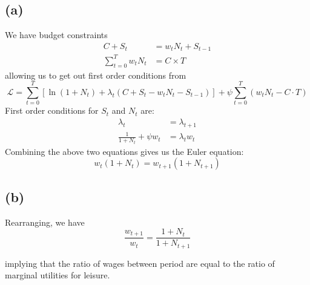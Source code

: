 \documentclass[11pt]{amsart}
\begin{document}
\subsection*{(a)}
We have budget constraints
	\begin{align*}
	C + S_t &= w_t N_t + S_{t-1} \\
	\sum_{t=0}^{T} w_t N_t & = C \times T
	\end{align*} 
allowing us to get out first order conditions from
	\begin{equation*}
	\mathcal{L} = \sum_{t=0}^{T}  \left[ \ln (1+ N_t) + \lambda_t \left(C + S_t - w_t N_t - S_{t-1} \right) \right] + \psi \sum_{t=0}^{T} \left( w_t N_t - C \cdot T\right)  
	\end{equation*}
    First order conditions for $S_t$ and $N_t$ are: 
    \begin{align*}
    \lambda_t &= \lambda_{t+1} \\
    \frac{1}{1+N_t} + \psi w_t &= \lambda_t w_t 
    \end{align*}
    Combining the above two equations gives us the Euler equation: 
    \begin{equation*}
    w_t (1+ N_t) = w_{t+1} (1+N_{t+1})
    \end{equation*}

\subsection*{(b)}
Rearranging, we have
    \begin{equation*}
    \frac{w_{t+1}}{w_t} = \frac{1+N_t}{1+ N_{t+1}} 
    \end{equation*}

implying that the ratio of wages between period are equal to the ratio of marginal utilities for leisure.
    
\end{document}
